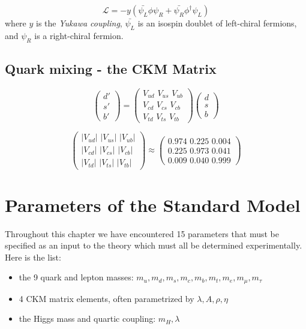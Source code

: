 \begin{equation}
\mathcal{L} = -y ( \bar{\psi_{L}} \phi \psi_{R} + \bar{\psi_{R}} \phi^{\dagger} \psi_{L})
\end{equation}
where $y$ is the \textit{Yukawa coupling}, $\bar{\psi_{L}}$ is an isospin doublet of left-chiral fermions, and $\psi_{R}$ is a right-chiral fermion.

\subsection{Quark mixing - the CKM Matrix}

\begin{equation}
\begin{pmatrix} d' \\ s' \\ b' \end{pmatrix} =
\begin{pmatrix} V_{ud} \,\, V_{us}  \,\, V_{ub} \\ V_{cd} \,\, V_{cs} \,\, V_{cb}  \\ V_{td} \,\, V_{ts} \,\, V_{tb} \end{pmatrix}
\begin{pmatrix} d \\ s \\ b \end{pmatrix}
\end{equation}

\begin{equation}
\begin{pmatrix} |V_{ud}| \,\, |V_{us}|  \,\, |V_{ub}| \\ |V_{cd}| \,\, |V_{cs}| \,\, |V_{cb}|  \\ |V_{td}| \,\, |V_{ts}| \,\, |V_{tb}| \end{pmatrix} \approx
\begin{pmatrix} 0.974 \,\, 0.225  \,\, 0.004 \\ 0.225 \,\, 0.973 \,\, 0.041  \\ 0.009 \,\, 0.040 \,\, 0.999 \end{pmatrix}
\end{equation}

\section{Parameters of the Standard Model}

Throughout this chapter we have encountered 15 parameters that must be specified as an input to the theory which must all be determined experimentally. Here is the list:
\begin{itemize}
\item the 9 quark and lepton masses: $m_{u}, m_{d}, m_{s}, m_{c}, m_{b}, m_{t}, m_{e}, m_{\mu}, m_{\tau}$
\item 4 CKM matrix elements, often parametrized by $\lambda, A, \rho, \eta$
\item the Higgs mass and quartic coupling: $m_{H}, \lambda$
\end{itemize}

